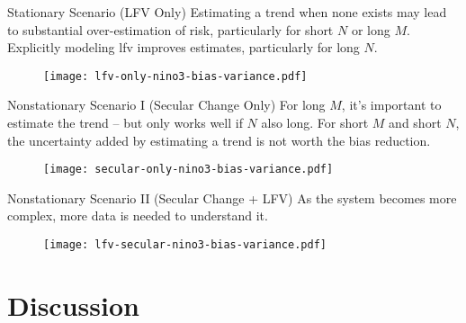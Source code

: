 \documentclass[
  10pt,     %
]{beamer}
\begin{document}
\begin{frame}{Stationary Scenario (LFV Only)}
  Estimating a trend when none exists may lead to substantial over-estimation of risk, particularly for short $N$ or long $M$.
  Explicitly modeling \gls{lfv} improves estimates, particularly for long $N$.
  \begin{figure}
    \centering
    \texttt{[image: lfv-only-nino3-bias-variance.pdf]}
  \end{figure}
\end{frame}

\begin{frame}{Nonstationary Scenario I (Secular Change Only)}
  For long $M$, it's important to estimate the trend -- but only works well if $N$ also long.
  For short $M$ and short $N$, the uncertainty added by estimating a trend is not worth the bias reduction.
  \begin{figure}
    \centering
    \texttt{[image: secular-only-nino3-bias-variance.pdf]}
  \end{figure}
\end{frame}

\begin{frame}{Nonstationary Scenario II (Secular Change + LFV)}
  As the system becomes more complex, more data is needed to understand it.
  \begin{figure}
    \centering
    \texttt{[image: lfv-secular-nino3-bias-variance.pdf]}
  \end{figure}
\end{frame}

\section{Discussion}
\end{document}
